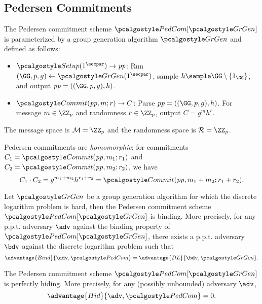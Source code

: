 \subsection{Pedersen Commitments}

\begin{definition}
  The Pedersen commitment scheme $\algo{PedCom}[\grgen]$ is parameterized by a group generation algorithm $\grgen$ and defined as follows:
  \begin{itemize}
  \item $\algo{Setup}(1^\secpar) \rightarrow \params$: Run $\gparam \gets \grgen(1^\secpar)$, sample $h \sample \GG \setminus \{1_\GG\}$, and output $\params = (\gparam, h)$.
  \item $\algo{Commit}(\params, m; r) \rightarrow C$: Parse $\params = ((\GG, p, g), h)$. For message $m \in \ZZ_p$ and randomness $r \in \ZZ_p$, output $C = g^m h^r$.
  \end{itemize}
  The message space is $\mathcal{M} = \ZZ_p$ and the randomness space is $\mathcal{R} = \ZZ_p$.
\end{definition}

\begin{remark}
  Pedersen commitments are \emph{homomorphic}: for commitments $C_1 = \algo{Commit}(\params, m_1; r_1)$ and $C_2 = \algo{Commit}(\params, m_2; r_2)$, we have
  \[
  C_1 \cdot C_2 = g^{m_1 + m_2} h^{r_1 + r_2} = \algo{Commit}(\params, m_1 + m_2; r_1 + r_2).
  \]
\end{remark}

\begin{theorem}
  Let $\grgen$ be a group generation algorithm for which the discrete logarithm problem is hard, then the Pedersen commitment scheme $\algo{PedCom}[\grgen]$ is binding.
  More precisely, for any p.p.t. adversary $\adv$ against the binding property of $\algo{PedCom}[\grgen]$, there exists a p.p.t. adversary $\bdv$ against the discrete logarithm problem such that
  \[
  \advantage{Bind}{\adv, \algo{PedCom}} = \advantage{DL}{\bdv, \grgen}.
  \]
\end{theorem}

\begin{theorem}
  The Pedersen commitment scheme $\algo{PedCom}[\grgen]$ is perfectly hiding.
  More precisely, for any (possibly unbounded) adversary $\adv$,
  \[
  \advantage{Hid}{\adv, \algo{PedCom}} = 0.
  \]
\end{theorem}

